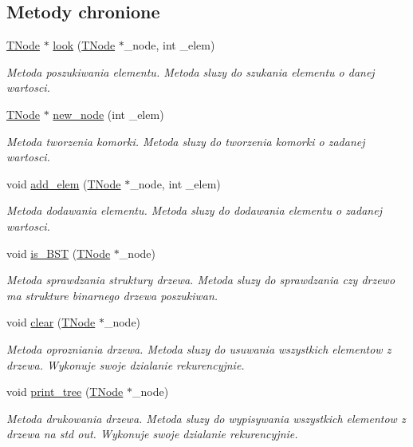 \subsection*{Metody chronione}
\begin{DoxyCompactItemize}
\item 
\hyperlink{struct_t_node}{T\-Node} $\ast$ \hyperlink{struct_binary_tree_a47e590bb37b4b419ac9eff13fb03b6cf}{look} (\hyperlink{struct_t_node}{T\-Node} $\ast$\-\_\-node, int \-\_\-elem)
\begin{DoxyCompactList}\small\item\em Metoda poszukiwania elementu. Metoda sluzy do szukania elementu o danej wartosci. \end{DoxyCompactList}\item 
\hyperlink{struct_t_node}{T\-Node} $\ast$ \hyperlink{struct_binary_tree_a749356c206465c8c4b7ef905a2a75f63}{new\-\_\-node} (int \-\_\-elem)
\begin{DoxyCompactList}\small\item\em Metoda tworzenia komorki. Metoda sluzy do tworzenia komorki o zadanej wartosci. \end{DoxyCompactList}\item 
void \hyperlink{struct_binary_tree_acffce31cb381fa5fd9029e420ec7bceb}{add\-\_\-elem} (\hyperlink{struct_t_node}{T\-Node} $\ast$\-\_\-node, int \-\_\-elem)
\begin{DoxyCompactList}\small\item\em Metoda dodawania elementu. Metoda sluzy do dodawania elementu o zadanej wartosci. \end{DoxyCompactList}\item 
void \hyperlink{struct_binary_tree_a95191528b6584bd3f05e38a91069f050}{is\-\_\-\-B\-S\-T} (\hyperlink{struct_t_node}{T\-Node} $\ast$\-\_\-node)
\begin{DoxyCompactList}\small\item\em Metoda sprawdzania struktury drzewa. Metoda sluzy do sprawdzania czy drzewo ma strukture binarnego drzewa poszukiwan. \end{DoxyCompactList}\item 
void \hyperlink{struct_binary_tree_a71e2586551ccbaff9b2dfcc61c27820f}{clear} (\hyperlink{struct_t_node}{T\-Node} $\ast$\-\_\-node)
\begin{DoxyCompactList}\small\item\em Metoda oprozniania drzewa. Metoda sluzy do usuwania wszystkich elementow z drzewa. Wykonuje swoje dzialanie rekurencyjnie. \end{DoxyCompactList}\item 
void \hyperlink{struct_binary_tree_ae0183134e9d30f5a61869df126e8bc2c}{print\-\_\-tree} (\hyperlink{struct_t_node}{T\-Node} $\ast$\-\_\-node)
\begin{DoxyCompactList}\small\item\em Metoda drukowania drzewa. Metoda sluzy do wypisywania wszystkich elementow z drzewa na std out. Wykonuje swoje dzialanie rekurencyjnie. \end{DoxyCompactList}\end{DoxyCompactItemize}
